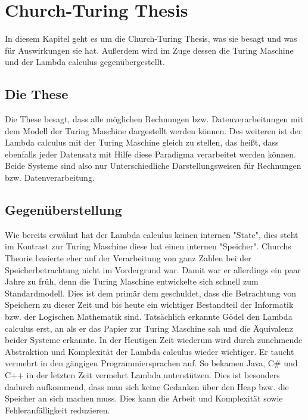 \section{Church-Turing Thesis}
In diesem Kapitel geht es um die Church-Turing Thesis, was sie besagt und was für Auswirkungen sie hat. Außerdem wird im Zuge dessen die Turing Maschine und der Lambda calculus gegenübergestellt.
\subsection{Die These}
Die These besagt, dass alle möglichen Rechnungen bzw. Datenverarbeitungen mit dem Modell der Turing Maschine dargestellt werden können. Des weiteren ist der Lambda calculus mit der Turing Maschine gleich zu stellen, das heißt, dass ebenfalls jeder Datensatz mit Hilfe diese Paradigma verarbeitet werden können. Beide Systeme sind also nur Unterschiedliche Darstellungsweisen für Rechnungen bzw. Datenverarbeitung.
\cite{sep-church-turing}
\subsection{Gegenüberstellung}
Wie bereits erwähnt hat der Lambda calculus keinen internen "State", dies steht im Kontrast zur Turing Maschine diese hat einen internen "Speicher". Churchs Theorie basierte eher auf der Verarbeitung von ganz Zahlen bei der Speicherbetrachtung nicht im Vordergrund war. Damit war er allerdings ein paar Jahre zu früh, denn die Turing Maschine entwickelte sich schnell zum Standardmodell. Dies ist dem primär dem geschuldet, dass die Betrachtung von Speichern zu dieser Zeit und bis heute ein wichtiger Bestandteil der Informatik bzw. der Logischen Mathematik sind. Tatsächlich erkannte Gödel den Lambda calculus erst, an als er das Papier zur Turing Maschine sah und die Äquivalenz beider Systeme erkannte.\cite{sep-church-turing} In der Heutigen Zeit wiederum wird durch zunehmende Abstraktion und Komplexität der Lambda calculus wieder wichtiger. Er taucht vermehrt in den gängigen Programmiersprachen auf. So bekamen Java, C\# und C++ in der letzten Zeit vermehrt Lambda unterstützen. Dies ist besonders dadurch aufkommend, dass man sich keine Gedanken über den Heap bzw. die Speicher an sich machen muss. Dies kann die Arbeit und Komplexität sowie Fehleranfälligkeit reduzieren.
